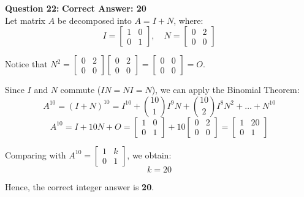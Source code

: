 \documentclass[11pt,a4paper]{article}
\begin{document}
\begin{tcolorbox}[solbox]
\textbf{\textcolor{primaryDark}{Question 22:}} \hfill \textbf{\textcolor{l1Green}{Correct Answer: 20}}\\
\vspace{4pt}
Let matrix $A$ be decomposed into $A = I + N$, where:
$$I = \begin{bmatrix} 1 & 0 \\ 0 & 1 \end{bmatrix}, \quad N = \begin{bmatrix} 0 & 2 \\ 0 & 0 \end{bmatrix}$$

Notice that $N^2 = \begin{bmatrix} 0 & 2 \\ 0 & 0 \end{bmatrix}\begin{bmatrix} 0 & 2 \\ 0 & 0 \end{bmatrix} = \begin{bmatrix} 0 & 0 \\ 0 & 0 \end{bmatrix} = O$.

Since $I$ and $N$ commute ($IN = NI = N$), we can apply the Binomial Theorem:
$$A^{10} = (I + N)^{10} = I^{10} + \binom{10}{1} I^9 N + \binom{10}{2} I^8 N^2 + \dots + N^{10}$$
$$A^{10} = I + 10N + O = \begin{bmatrix} 1 & 0 \\ 0 & 1 \end{bmatrix} + 10 \begin{bmatrix} 0 & 2 \\ 0 & 0 \end{bmatrix} = \begin{bmatrix} 1 & 20 \\ 0 & 1 \end{bmatrix}$$

Comparing with $A^{10} = \begin{bmatrix} 1 & k \\ 0 & 1 \end{bmatrix}$, we obtain:
$$k = 20$$

Hence, the correct integer answer is \textbf{20}.
\end{tcolorbox}
\end{document}
